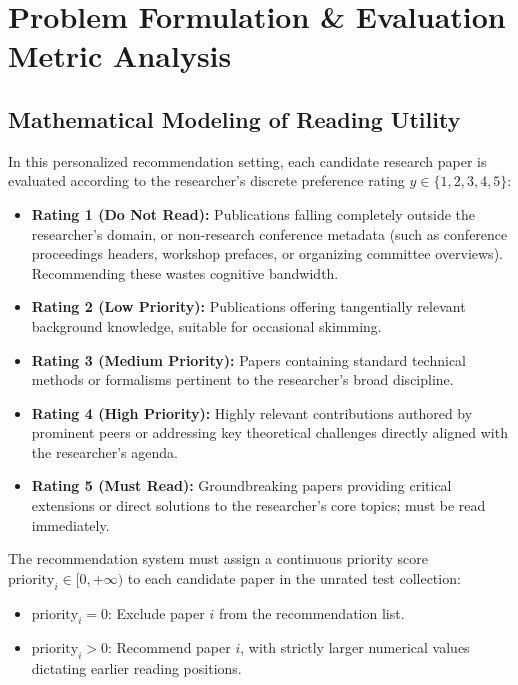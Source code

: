 \chapter{Problem Formulation \& Evaluation Metric Analysis}
\label{chap:problem}

\section{Mathematical Modeling of Reading Utility}
In this personalized recommendation setting, each candidate research paper is evaluated according to the researcher's discrete preference rating $y \in \{1, 2, 3, 4, 5\}$:
\begin{itemize}
  \item \textbf{Rating 1 (Do Not Read):} Publications falling completely outside the researcher's domain, or non-research conference metadata (such as conference proceedings headers, workshop prefaces, or organizing committee overviews). Recommending these wastes cognitive bandwidth.
  \item \textbf{Rating 2 (Low Priority):} Publications offering tangentially relevant background knowledge, suitable for occasional skimming.
  \item \textbf{Rating 3 (Medium Priority):} Papers containing standard technical methods or formalisms pertinent to the researcher's broad discipline.
  \item \textbf{Rating 4 (High Priority):} Highly relevant contributions authored by prominent peers or addressing key theoretical challenges directly aligned with the researcher's agenda.
  \item \textbf{Rating 5 (Must Read):} Groundbreaking papers providing critical extensions or direct solutions to the researcher's core topics; must be read immediately.
\end{itemize}

The recommendation system must assign a continuous priority score $\text{priority}_i \in [0, +\infty)$ to each candidate paper in the unrated test collection:
\begin{itemize}
  \item $\text{priority}_i = 0$: Exclude paper $i$ from the recommendation list.
  \item $\text{priority}_i > 0$: Recommend paper $i$, with strictly larger numerical values dictating earlier reading positions.
\end{itemize}

